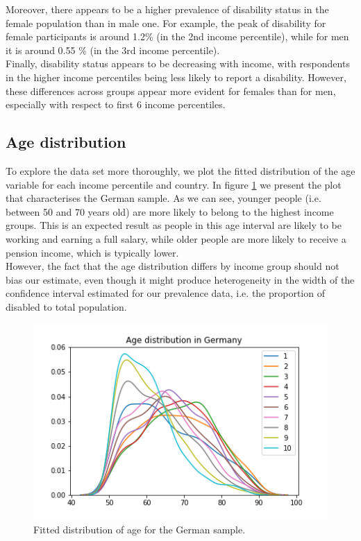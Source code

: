 \documentclass[\main/main.tex]{subfiles}
\begin{document}
Moreover, there appears to be a higher prevalence of disability status in the female population than in male one. For example, the peak of disability for female participants is around 1.2\% (in the 2nd income percentile), while for men it is around 0.55 \% (in the 3rd income percentile).\\

Finally, disability status appears to be decreasing with income, with respondents in the higher income percentiles being less likely to report a disability. However, these differences across groups appear more evident for females than for men, especially with respect to first 6 income percentiles.


\subsection{Age distribution}

To explore the data set more thoroughly, we plot the fitted distribution of the age variable for each income percentile and country. In figure \ref{fig:age_distr_germany} we present the plot that characterises the German sample. As we can see, younger people (i.e. between 50 and 70 years old) are more likely to belong to the highest income groups. This is an expected result as people in this age interval are likely to be working and earning a full salary, while older people are more likely to receive a pension income, which is typically lower.\\
However, the fact that the age distribution differs by income group should not bias our estimate, even though it might produce heterogeneity in the width of the confidence interval estimated for our prevalence data, i.e. the proportion of disabled to total population.




\begin{figure}[H]
        \centering
        \includegraphics[scale=.5]{images/Age_distribution_in_Germany.png}
    \caption{Fitted distribution of age for the German sample.}
    \label{fig:age_distr_germany}
\end{figure}
\end{document}
